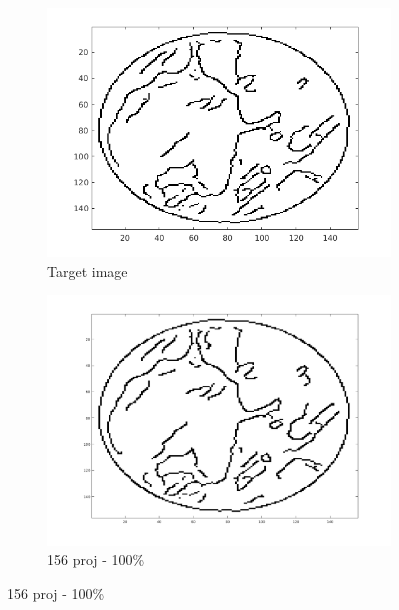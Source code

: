 \documentclass[10pt,a4paper,titlepage]{article}
\begin{document}
		
		\begin{figure}[H]
		
       		\centering
      		\begin{subfigure}[b]{0.32\textwidth}
            	\centering
            	\includegraphics[width=\textwidth]{Sample1/Edges/target_auto.png}
            	\caption{Target image}    
        	\end{subfigure}
        	\begin{subfigure}[b]{0.32\textwidth}  
            	\centering 
            	\includegraphics[width=\textwidth]{Sample1/Edges/SB/fully_auto.png}
            	\caption{156 proj - 100\%}    
            	\label{subfig:156p1L-D}
        	\end{subfigure}

\end{figure}
\end{document}
